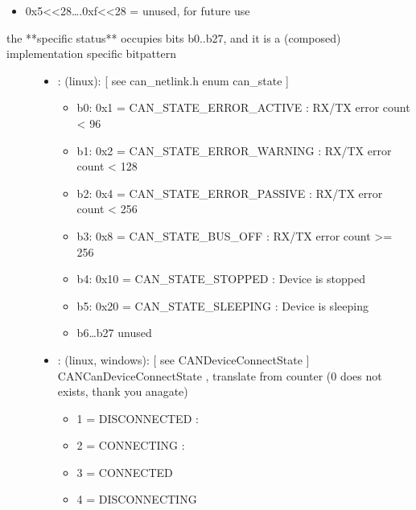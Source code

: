 \documentclass[a4paper,10pt,english]{sphinxmanual}
\begin{document}
\begin{fulllineitems}
\begin{fulllineitems}
\begin{itemize}
\item {} 
0x5\textless{}\textless{}28….0xf\textless{}\textless{}28 = unused, for future use

\end{itemize}


the **specific status** occupies bits b0..b27, and it is a (composed) implementation specific bitpattern

\begin{description}
\item[{}] \leavevmode\begin{itemize}
\item {} 
: (linux): {[} see can\_netlink.h enum can\_state {]}\begin{itemize}
\item {} 
b0: 0x1 = CAN\_STATE\_ERROR\_ACTIVE : RX/TX error count \textless{} 96

\item {} 
b1: 0x2 = CAN\_STATE\_ERROR\_WARNING : RX/TX error count \textless{} 128

\item {} 
b2: 0x4 = CAN\_STATE\_ERROR\_PASSIVE : RX/TX error count \textless{} 256

\item {} 
b3: 0x8 = CAN\_STATE\_BUS\_OFF : RX/TX error count \textgreater{}= 256

\item {} 
b4: 0x10 = CAN\_STATE\_STOPPED : Device is stopped

\item {} 
b5: 0x20 = CAN\_STATE\_SLEEPING : Device is sleeping

\item {} 
b6…b27 unused

\end{itemize}


\item {} 
: (linux, windows): {[} see CANDeviceConnectState {]} CANCanDeviceConnectState , translate from counter (0 does not exists, thank you anagate)\begin{itemize}
\item {} 
1 = DISCONNECTED :

\item {} 
2 = CONNECTING :

\item {} 
3 = CONNECTED

\item {} 
4 = DISCONNECTING


\end{itemize}
\end{itemize}
\end{description}
\end{fulllineitems}
\end{fulllineitems}
\end{document}
